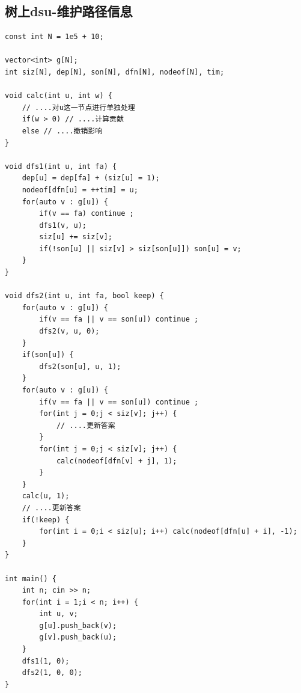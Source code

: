 \documentclass[twoside]{article}
\begin{document}
\subsection{树上dsu-维护路径信息}
\begin{lstlisting}
const int N = 1e5 + 10;

vector<int> g[N];
int siz[N], dep[N], son[N], dfn[N], nodeof[N], tim;

void calc(int u, int w) {
    // ....对u这一节点进行单独处理
    if(w > 0) // ....计算贡献
    else // ....撤销影响
}

void dfs1(int u, int fa) {
    dep[u] = dep[fa] + (siz[u] = 1);
    nodeof[dfn[u] = ++tim] = u;
    for(auto v : g[u]) {
        if(v == fa) continue ;
        dfs1(v, u);
        siz[u] += siz[v];
        if(!son[u] || siz[v] > siz[son[u]]) son[u] = v;
    }
}

void dfs2(int u, int fa, bool keep) {
    for(auto v : g[u]) {
        if(v == fa || v == son[u]) continue ;
        dfs2(v, u, 0);
    }
    if(son[u]) {
        dfs2(son[u], u, 1);
    }
    for(auto v : g[u]) {
        if(v == fa || v == son[u]) continue ;
        for(int j = 0;j < siz[v]; j++) {
            // ....更新答案
        }
        for(int j = 0;j < siz[v]; j++) {
            calc(nodeof[dfn[v] + j], 1);
        }
    }
    calc(u, 1);
    // ....更新答案
    if(!keep) {
        for(int i = 0;i < siz[u]; i++) calc(nodeof[dfn[u] + i], -1);
    }
}

int main() {
    int n; cin >> n;
    for(int i = 1;i < n; i++) {
        int u, v;
        g[u].push_back(v);
        g[v].push_back(u);
    }
    dfs1(1, 0);
    dfs2(1, 0, 0);
}\end{lstlisting}
\end{document}
